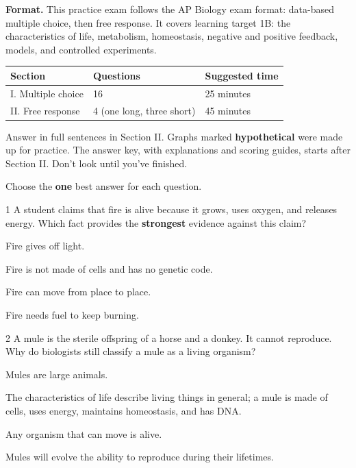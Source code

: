 \documentclass[11pt,letterpaper]{article}
\begin{document}
\textbf{Format.} This practice exam follows the AP Biology exam format: data-based multiple choice, then free response. It covers learning target 1B: the characteristics of life, metabolism, homeostasis, negative and positive feedback, models, and controlled experiments.

\begin{center}
\begin{tabular}{@{}lll@{}}
\toprule
Section & Questions & Suggested time \\
\midrule
I. Multiple choice & 16 & 25 minutes \\
II. Free response & 4 (one long, three short) & 45 minutes \\
\bottomrule
\end{tabular}
\end{center}

Answer in full sentences in Section II. Graphs marked \textbf{hypothetical} were made up for practice. The answer key, with explanations and scoring guides, starts after Section II. Don't look until you've finished.

\clearpage


Choose the \textbf{one} best answer for each question.


\begin{mcq}{1}
A student claims that fire is alive because it grows, uses oxygen, and releases energy. Which fact provides the \textbf{strongest} evidence against this claim?
\begin{choices}
  \item Fire gives off light.
  \item Fire is not made of cells and has no genetic code.
  \item Fire can move from place to place.
  \item Fire needs fuel to keep burning.
\end{choices}
\end{mcq}

\begin{mcq}{2}
A mule is the sterile offspring of a horse and a donkey. It cannot reproduce. Why do biologists still classify a mule as a living organism?
\begin{choices}
  \item Mules are large animals.
  \item The characteristics of life describe living things in general; a mule is made of cells, uses energy, maintains homeostasis, and has DNA.
  \item Any organism that can move is alive.
  \item Mules will evolve the ability to reproduce during their lifetimes.
\end{choices}
\end{mcq}
\end{document}
